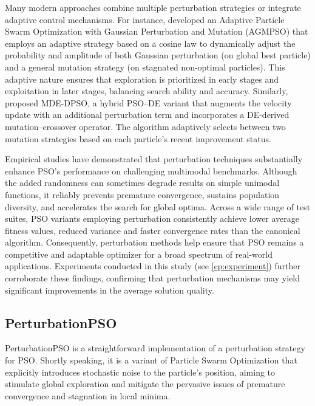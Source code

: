 {Many modern approaches combine multiple perturbation strategies or integrate adaptive control mechanisms. For instance, \citet{chen2021adaptive} developed an Adaptive Particle Swarm Optimization with Gaussian Perturbation and Mutation (AGMPSO) that employs an adaptive strategy based on a cosine law to dynamically adjust the probability and amplitude of both Gaussian perturbation (on global best particle) and a general mutation strategy (on stagnated non-optimal particles). This adaptive nature ensures that exploration is prioritized in early stages and exploitation in later stages, balancing search ability and accuracy.
Similarly, \citet{xu2025hybrid} proposed MDE-DPSO, a hybrid PSO–DE variant that augments the velocity update with an additional perturbation term and incorporates a DE-derived mutation–crossover operator. The algorithm adaptively selects between two mutation strategies based on each particle’s recent improvement status.

Empirical studies have demonstrated that perturbation techniques substantially enhance PSO’s performance on challenging multimodal benchmarks. Although the added randomness can sometimes degrade results on simple unimodal functions, it reliably prevents premature convergence, sustains population diversity, and accelerates the search for global optima. Across a wide range of test suites, PSO variants employing perturbation consistently achieve lower average fitness values, reduced variance and faster convergence rates than the canonical algorithm. Consequently, perturbation methods help ensure that PSO remains a competitive and adaptable optimizer for a broad spectrum of real-world applications. Experiments conducted in this study  (see \autoref{cp:experiment}) further corroborate these findings, confirming that perturbation mechanisms may yield significant improvements in the average solution quality.


\subsection*{PerturbationPSO}

PerturbationPSO is a straightforward implementation of a perturbation strategy for PSO. Shortly speaking, it is a variant of Particle Swarm Optimization that explicitly introduces stochastic noise to the particle's position, aiming to stimulate global exploration and mitigate the pervasive issues of premature convergence and stagnation in local minima.

}

